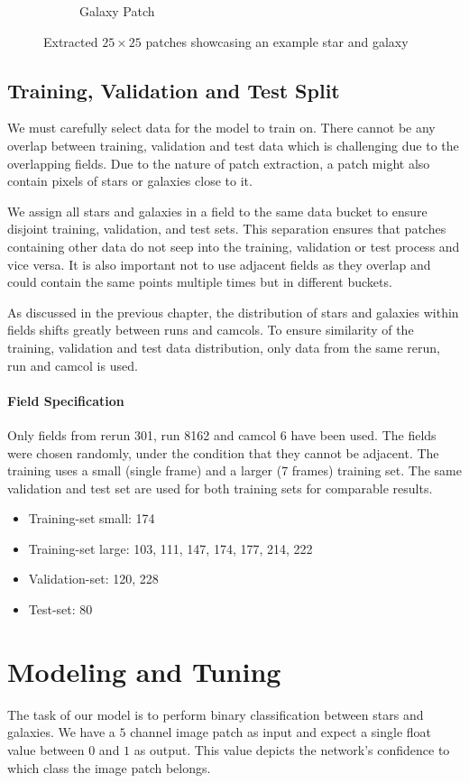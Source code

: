 \documentclass[
a4paper,     %
10pt         %
]{scrartcl}  %
\begin{document}
\begin{figure}[H]
\begin{subfigure}{.49\textwidth}
        \caption{Galaxy Patch}
    \end{subfigure}
    \caption{\label{fig:patches}Extracted $25 \times 25$ patches showcasing an example star and galaxy}
\end{figure}

\subsection{Training, Validation and Test Split}
We must carefully select data for the model to train on.
There cannot be any overlap between training, validation and test data which is challenging due to the overlapping fields.
Due to the nature of patch extraction, a patch might also contain pixels of stars or galaxies close to it.

We assign all stars and galaxies in a field to the same data bucket to ensure disjoint training, validation, and test sets.
This separation ensures that patches containing other data do not seep into the training, validation or test process and vice versa.
It is also important not to use adjacent fields as they overlap and could contain the same points multiple times but in different buckets.

As discussed in the previous chapter, the distribution of stars and galaxies within fields shifts greatly between runs and camcols.
To ensure similarity of the training, validation and test data distribution, only data from the same rerun, run and camcol is used.

\paragraph{Field Specification}
Only fields from rerun 301, run 8162 and camcol 6 have been used.
The fields were chosen randomly, under the condition that they cannot be adjacent.
The training uses a small (single frame) and a larger (7 frames) training set.
The same validation and test set are used for both training sets for comparable results.

\begin{itemize}
    \item Training-set small: 174
    \item Training-set large: 103, 111, 147, 174, 177, 214, 222
    \item Validation-set: 120, 228
    \item Test-set: 80
\end{itemize}


\section{Modeling and Tuning}
The task of our model is to perform binary classification between stars and galaxies.
We have a $5$ channel image patch as input and expect a single float value between $0$ and $1$  as output.
This value depicts the network's confidence to which class the image patch belongs.
\end{document}
